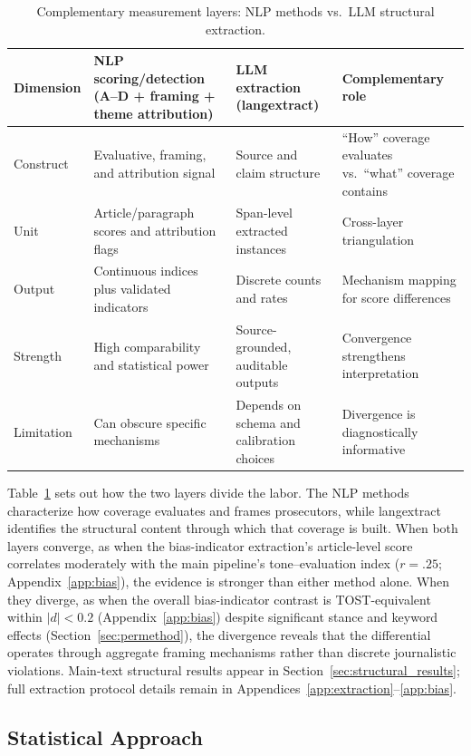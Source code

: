 \documentclass[12pt, letterpaper]{article}
\begin{document}
\begin{table}[ht]
\centering
\caption{Complementary measurement layers: NLP methods vs.\ LLM structural extraction.}
\label{tab:methods_complement}
\small
\begin{tabularx}{\textwidth}{p{2.0cm}p{3.2cm}p{3.2cm}X}
\toprule
Dimension & NLP scoring/detection (A--D + framing + theme attribution) & LLM extraction (langextract) & Complementary role \\
\midrule
Construct & Evaluative, framing, and attribution signal & Source and claim structure & ``How'' coverage evaluates vs.\ ``what'' coverage contains \\
Unit & Article/paragraph scores and attribution flags & Span-level extracted instances & Cross-layer triangulation \\
Output & Continuous indices plus validated indicators & Discrete counts and rates & Mechanism mapping for score differences \\
Strength & High comparability and statistical power & Source-grounded, auditable outputs & Convergence strengthens interpretation \\
Limitation & Can obscure specific mechanisms & Depends on schema and calibration choices & Divergence is diagnostically informative \\
\bottomrule
\end{tabularx}
\end{table}

Table~\ref{tab:methods_complement} sets out how the two layers divide the labor. The NLP methods characterize how coverage evaluates and frames prosecutors, while langextract identifies the structural content through which that coverage is built. When both layers converge, as when the bias-indicator extraction's article-level score correlates moderately with the main pipeline's tone--evaluation index ($r = .25$; Appendix~\ref{app:bias}), the evidence is stronger than either method alone. When they diverge, as when the overall bias-indicator contrast is TOST-equivalent within $|d| < 0.2$ (Appendix~\ref{app:bias}) despite significant stance and keyword effects (Section~\ref{sec:permethod}), the divergence reveals that the differential operates through aggregate framing mechanisms rather than discrete journalistic violations. Main-text structural results appear in Section~\ref{sec:structural_results}; full extraction protocol details remain in Appendices~\ref{app:extraction}--\ref{app:bias}.

\subsection{Statistical Approach}
\label{sec:methods}
\end{document}
